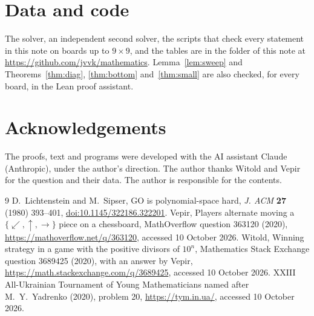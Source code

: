\documentclass[11pt]{article}
\theoremstyle{remark}
\begin{document}
\section*{Data and code}
The solver, an independent second solver, the scripts that check every statement in this note
on boards up to $9\times 9$, and the tables are in the folder of this note at
\url{https://github.com/jvvk/mathematics}. Lemma~\ref{lem:sweep} and Theorems~\ref{thm:diag},
\ref{thm:bottom} and~\ref{thm:small} are also checked, for every board, in the Lean proof assistant.

\section*{Acknowledgements}
The proofs, text and programs were developed with the AI assistant Claude (Anthropic), under the
author's direction. The author thanks Witold and Vepir for the question and their data. The
author is responsible for the contents.

\begin{thebibliography}{9}
 D.~Lichtenstein and M.~Sipser, GO is polynomial-space hard, \emph{J. ACM}
\textbf{27} (1980) 393--401, \href{https://doi.org/10.1145/322186.322201}{doi:10.1145/322186.322201}.
 Vepir, Players alternate moving a $\{\swarrow,\uparrow,\rightarrow\}$ piece on a
chessboard, MathOverflow question 363120 (2020), \url{https://mathoverflow.net/q/363120},
accessed 10 October 2026.
 Witold, Winning strategy in a game with the positive divisors of $10^n$,
Mathematics Stack Exchange question 3689425 (2020), with an answer by Vepir,
\url{https://math.stackexchange.com/q/3689425}, accessed 10 October 2026.
 XXIII All-Ukrainian Tournament of Young Mathematicians named after M.~Y.~Yadrenko
(2020), problem 20, \url{https://tym.in.ua/}, accessed 10 October 2026.
\end{thebibliography}
\end{document}
